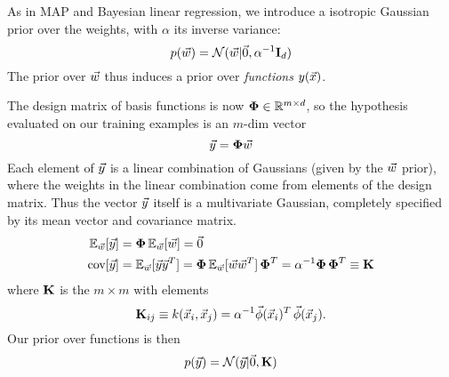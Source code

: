 \documentclass[11pt]{article}
\begin{document}
As in MAP and Bayesian linear regression, we introduce a isotropic Gaussian prior over
the weights, with $\alpha$ its inverse variance:
\begin{equation}
  p(\vec{w}) = \mathcal{N}(\vec{w} | \vec{0}, \alpha^{-1} \mathbf{I}_d)
\end{equation}
The prior over $\vec{w}$ thus induces a prior over \emph{functions} $y(\vec{x})$.

The design matrix of basis functions is now $\boldsymbol{\Phi} \in \mathbb{R}^{m \times d}$, so the
hypothesis evaluated on our training examples is an $m$-dim vector
\begin{equation}
  \vec{y} = \boldsymbol{\Phi} \vec{w}
\end{equation}
Each element of $\vec{y}$ is a linear combination of Gaussians (given by the $\vec{w}$
prior), where the weights in the linear combination come from elements of the design
matrix. Thus the vector $\vec{y}$ itself is a multivariate Gaussian, completely specified
by its mean vector and covariance matrix.
\begin{align}
  \mathbb{E}_{\vec{w}}[\vec{y}] &= \boldsymbol{\Phi}\, \mathbb{E}_{\vec{w}}[\vec{w}] = \vec{0} \\
  \textrm{cov}[\vec{y}]  &= \mathbb{E}_{\vec{w}}[\vec{y} \vec{y}^T]
                      = \boldsymbol{\Phi}\, \mathbb{E}_{\vec{w}}[\vec{w} \vec{w}^T]\, \boldsymbol{\Phi}^T
                      = \alpha^{-1} \boldsymbol{\Phi}\, \boldsymbol{\Phi}^T
                      \equiv \mathbf{K}
\end{align}
where $\mathbf{K}$ is the $m \times m$  with elements
\begin{equation}
  \mathbf{K}_{ij} \equiv k(\vec{x}_i, \vec{x}_j) = \alpha^{-1} \vec{\phi}(\vec{x}_i)^T\,
  \vec{\phi}(\vec{x}_j). 
\end{equation}
Our prior over functions is then
\begin{equation}
  p(\vec{y}) = \mathcal{N}(\vec{y} | \vec{0}, \mathbf{K})
\end{equation}
\end{document}
